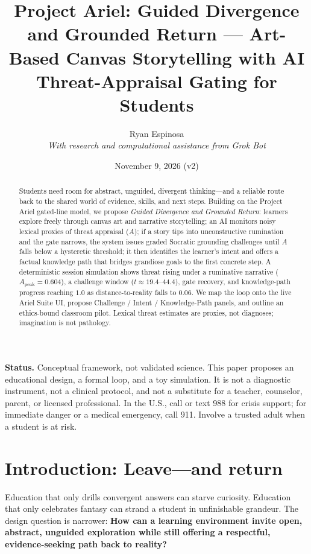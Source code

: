 \documentclass[11pt, a4paper]{article}
\title{Project Ariel: Guided Divergence and Grounded Return --- Art-Based Canvas Storytelling with AI Threat-Appraisal Gating for Students}
\author{Ryan Espinosa \\ \textit{With research and computational assistance from Grok Bot}}
\date{November 9, 2026 (v2)}
\begin{document}
\maketitle

\noindent\textbf{Status.} Conceptual framework, not validated science. This paper proposes an educational design, a formal loop, and a toy simulation. It is not a diagnostic instrument, not a clinical protocol, and not a substitute for a teacher, counselor, parent, or licensed professional. In the U.S., call or text 988 for crisis support; for immediate danger or a medical emergency, call 911. Involve a trusted adult when a student is at risk.

\begin{abstract}
Students need room for abstract, unguided, divergent thinking---and a reliable route back to the shared world of evidence, skills, and next steps. Building on the Project Ariel gated-line model, we propose \emph{Guided Divergence and Grounded Return}: learners explore freely through canvas art and narrative storytelling; an AI monitors noisy lexical proxies of threat appraisal ($A$); if a story tips into unconstructive rumination and the gate narrows, the system issues graded Socratic grounding challenges until $A$ falls below a hysteretic threshold; it then identifies the learner's intent and offers a factual knowledge path that bridges grandiose goals to the first concrete step. A deterministic session simulation shows threat rising under a ruminative narrative ($A_{\mathrm{peak}}=0.604$), a challenge window ($t\approx19.4$--$44.4$), gate recovery, and knowledge-path progress reaching $1.0$ as distance-to-reality falls to $0.06$. We map the loop onto the live Ariel Suite UI, propose Challenge / Intent / Knowledge-Path panels, and outline an ethics-bound classroom pilot. Lexical threat estimates are proxies, not diagnoses; imagination is not pathology.
\end{abstract}

\section{Introduction: Leave---and return}
Education that only drills convergent answers can starve curiosity. Education that only celebrates fantasy can strand a student in unfinishable grandeur. The design question is narrower: \textbf{How can a learning environment invite open, abstract, unguided exploration while still offering a respectful, evidence-seeking path back to reality?}
\end{document}
